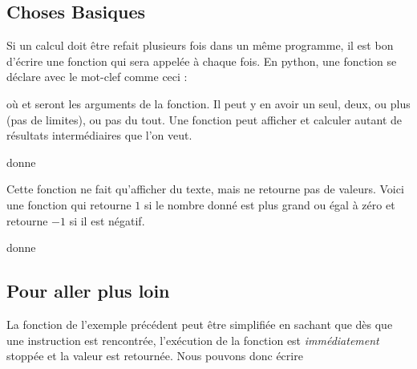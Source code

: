 \subsection{Choses Basiques}

Si un calcul doit être refait plusieurs fois dans un même programme, il est bon d'écrire une fonction qui sera appelée à chaque fois. En python, une fonction se déclare avec le mot-clef  comme ceci :
\begin{quote}
\end{quote}
où  et  seront les arguments de la fonction. Il peut y en avoir un seul, deux, ou plus (pas de limites), ou pas du tout. Une fonction peut afficher et calculer autant de résultats intermédiaires que l'on veut. 



donne



Cette fonction ne fait qu'afficher du texte, mais ne retourne pas de valeurs. Voici une fonction qui retourne \( 1\) si le nombre donné est plus grand ou égal à zéro et retourne \( -1\) si il est négatif.




donne



\subsection{Pour aller plus loin}

La fonction de l'exemple précédent peut être simplifiée en sachant que dès que une instruction  est rencontrée, l'exécution de la fonction est \emph{immédiatement} stoppée et la valeur est retournée. Nous pouvons donc écrire



